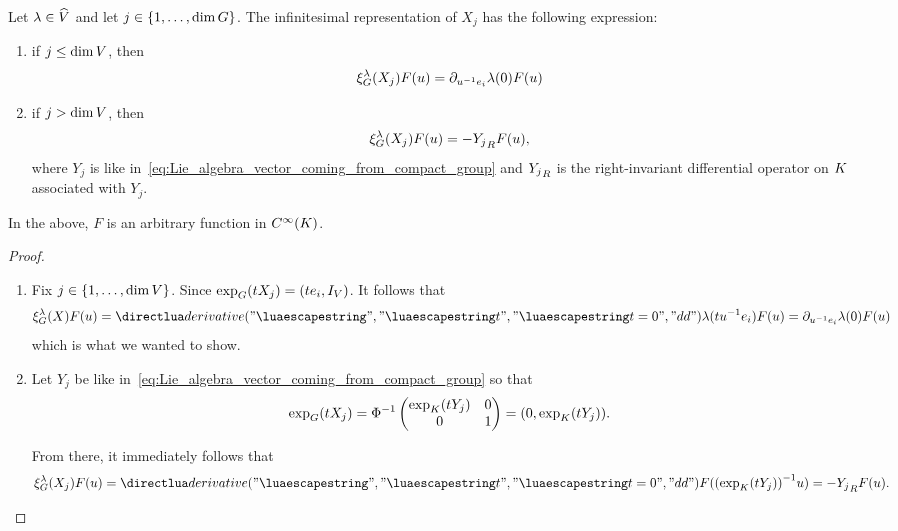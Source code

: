 \begin{proposition}
\label{proposition:infinitesimal_representations_of_differential_operators}
    Let $\lambda \in {\widehat{V}}$ and let $j \in \{1, \dots, \dim G\}$.
    The infinitesimal representation of $X_j$ has the following expression:
    \begin{enumerate}
        \item if $j \leq \dim V$, then
            \begin{align*}
                \xi^{\lambda}_{G}(X_j) F(u) = \partial_{u^{-1} e_i} \lambda(0) F(u)
            \end{align*}
        \item if $j > \dim V$, then
            \begin{align*}
                \xi^{\lambda}_{G}(X_j) F(u) = -{Y_j}_R F(u),
            \end{align*}
            where $Y_j$ is like in~\eqref{eq:Lie_algebra_vector_coming_from_compact_group} and
            ${Y_j}_R$ is the right-invariant differential operator on $K$ associated with $Y_j$.
    \end{enumerate}
    In the above, $F$ is an arbitrary function in ${C^\infty(K)}$.
\end{proposition}
\begin{proof}
    \begin{enumerate}
        \item Fix $j \in \{1, \dots, \dim V\}$.
            Since $\exp_G(t X_j) = (t e_i, {I_{V}})$.
            It follows that
            \begin{align*}
                \Rep{\lambda}(X) F(u) = \D*{t}<t = 0> \lambda(t u^{-1} e_i) F(u)
                = \directionalDerivative{u^{-1} e_i} \lambda(0) F(u)
            \end{align*}
            which is what we wanted to show.
        \item Let $Y_j$ be like in~\eqref{eq:Lie_algebra_vector_coming_from_compact_group} so that
            \begin{align*}
                \exp_G(t X_j) = \Phi^{-1}
                    \begin{pmatrix}
                        \exp_K(t Y_j) & 0\\
                        0 & 1
                    \end{pmatrix}
                    = (0, \exp_K(t Y_j)).
            \end{align*}

            From there, it immediately follows that
            \begin{align*}
                \Rep{\lambda}(X_j) F(u)
                = \D*{t}<t = 0> F({(\exp_\CompactGroup(t Y_j))}^{-1} u)
                = -\RightDifferentialOperatorFirstOrder{Y_j} F(u).
            \end{align*}
    \end{enumerate}
\end{proof}

